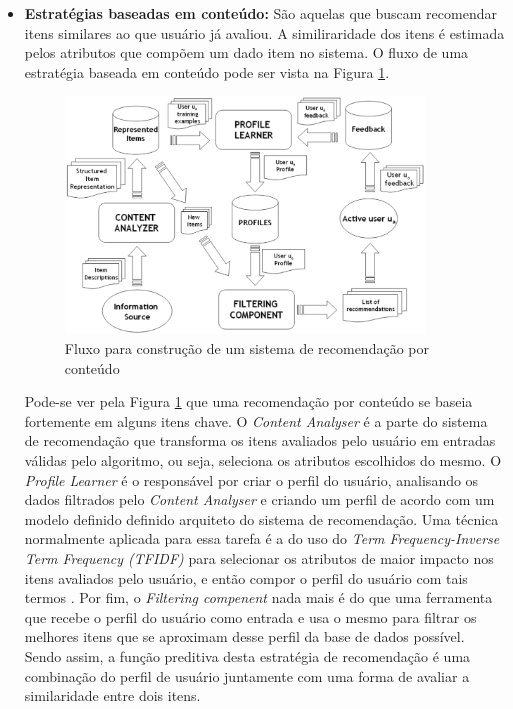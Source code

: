 \begin{itemize}
    \item \textbf{Estratégias baseadas em conteúdo: } São aquelas que buscam
        recomendar itens similares ao que usuário já avaliou. A similiraridade
        dos itens é estimada pelos atributos que compõem um dado item no
        sistema. O fluxo de uma estratégia baseada em conteúdo pode ser vista na
        Figura \ref{fig:recomendacao_conteudo}.

        \begin{figure}[h]
            \centering
            \includegraphics[width=0.9\textwidth]{figuras/recomendacao_conteudo}
            \caption{Fluxo para construção de um sistema de recomendação por
            conteúdo \cite{lops2011content}}
            \label{fig:recomendacao_conteudo}
        \end{figure}

        Pode-se ver pela Figura \ref{fig:recomendacao_conteudo} que uma recomendação
        por conteúdo se baseia fortemente em alguns itens chave. O
        \textit{Content Analyser} é a parte do sistema de recomendação que
        transforma os itens avaliados pelo usuário em entradas válidas pelo
        algoritmo, ou seja, seleciona os atributos escolhidos do mesmo. O
        \textit{Profile Learner} é o responsável por criar o perfil do
        usuário, analisando os dados filtrados pelo \textit{Content Analyser} e
        criando um perfil de acordo com um modelo definido definido arquiteto do
        sistema de recomendação. Uma técnica normalmente aplicada para essa tarefa
        é a do uso do \textit{Term Frequency-Inverse Term Frequency (TFIDF)}
        para selecionar os atributos de maior impacto nos itens avaliados pelo
        usuário, e então compor o perfil do usuário com tais termos
        \cite{lops2011content}. Por fim, o \textit{Filtering compenent} nada mais é do que uma
        ferramenta que recebe o perfil do usuário como entrada e usa o mesmo
        para filtrar os melhores itens que se aproximam desse perfil da base de
        dados possível. Sendo assim, a função preditiva desta estratégia de
        recomendação é uma combinação do perfil de usuário juntamente com uma
        forma de avaliar a similaridade entre dois itens.


\end{itemize}
